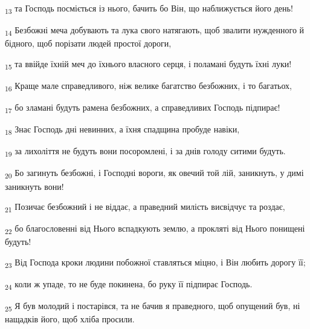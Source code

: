 \begin{tcolorbox}
\textsubscript{13} та Господь посміється із нього, бачить бо Він, що наближується його день!
\end{tcolorbox}
\begin{tcolorbox}
\textsubscript{14} Безбожні меча добувають та лука свого натягають, щоб звалити нужденного й бідного, щоб порізати людей простої дороги,
\end{tcolorbox}
\begin{tcolorbox}
\textsubscript{15} та ввійде їхній меч до їхнього власного серця, і поламані будуть їхні луки!
\end{tcolorbox}
\begin{tcolorbox}
\textsubscript{16} Краще мале справедливого, ніж велике багатство безбожних, і то багатьох,
\end{tcolorbox}
\begin{tcolorbox}
\textsubscript{17} бо зламані будуть рамена безбожних, а справедливих Господь підпирає!
\end{tcolorbox}
\begin{tcolorbox}
\textsubscript{18} Знає Господь дні невинних, а їхня спадщина пробуде навіки,
\end{tcolorbox}
\begin{tcolorbox}
\textsubscript{19} за лихоліття не будуть вони посоромлені, і за днів голоду ситими будуть.
\end{tcolorbox}
\begin{tcolorbox}
\textsubscript{20} Бо загинуть безбожні, і Господні вороги, як овечий той лій, заникнуть, у димі заникнуть вони!
\end{tcolorbox}
\begin{tcolorbox}
\textsubscript{21} Позичає безбожний і не віддає, а праведний милість висвідчує та роздає,
\end{tcolorbox}
\begin{tcolorbox}
\textsubscript{22} бо благословенні від Нього вспадкують землю, а прокляті від Нього понищені будуть!
\end{tcolorbox}
\begin{tcolorbox}
\textsubscript{23} Від Господа кроки людини побожної ставляться міцно, і Він любить дорогу її;
\end{tcolorbox}
\begin{tcolorbox}
\textsubscript{24} коли ж упаде, то не буде покинена, бо руку її підпирає Господь.
\end{tcolorbox}
\begin{tcolorbox}
\textsubscript{25} Я був молодий і постарівся, та не бачив я праведного, щоб опущений був, ні нащадків його, щоб хліба просили.
\end{tcolorbox}
